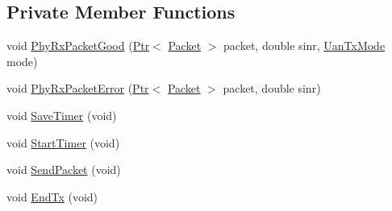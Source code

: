 \subsection*{Private Member Functions}
\begin{DoxyCompactItemize}
\item 
void \hyperlink{classns3_1_1UanMacCw_ab64da4cbab0645939aa9d02091e10755}{Phy\+Rx\+Packet\+Good} (\hyperlink{classns3_1_1Ptr}{Ptr}$<$ \hyperlink{classns3_1_1Packet}{Packet} $>$ packet, double sinr, \hyperlink{classns3_1_1UanTxMode}{Uan\+Tx\+Mode} mode)
\item 
void \hyperlink{classns3_1_1UanMacCw_aaed7a66d2404f6bbe4ea5bef7a9f228a}{Phy\+Rx\+Packet\+Error} (\hyperlink{classns3_1_1Ptr}{Ptr}$<$ \hyperlink{classns3_1_1Packet}{Packet} $>$ packet, double sinr)
\item 
void \hyperlink{classns3_1_1UanMacCw_adf36d5205c9faa7ed420ba1dce1114b2}{Save\+Timer} (void)
\item 
void \hyperlink{classns3_1_1UanMacCw_abccf11eaf1c64c0fe18d47443ca2e280}{Start\+Timer} (void)
\item 
void \hyperlink{classns3_1_1UanMacCw_a7bd89a516116e1bc2896ed84ad78a34c}{Send\+Packet} (void)
\item 
void \hyperlink{classns3_1_1UanMacCw_a1bd8399c61787208726aa7350834602d}{End\+Tx} (void)
\end{DoxyCompactItemize}
